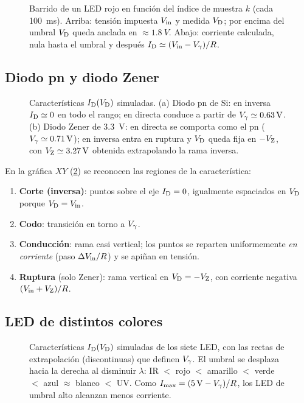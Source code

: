 \documentclass[11pt,a4paper]{article}
\begin{document}
\begin{figure}[htbp]
  \centering
  
  \caption{Barrido de un LED rojo en función del índice de muestra $k$
  (cada \SI{100}{ms}). Arriba: tensión impuesta $V_{\mathrm{in}}$ y medida $V_{\mathrm D}$; por
  encima del umbral $V_{\mathrm D}$ queda anclada en $\approx\SI{1.8}{V}$. Abajo:
  corriente calculada, nula hasta el umbral y después
  $I_{\mathrm D}\simeq(V_{\mathrm{in}}-V_{\gamma})/R$.}
  \label{fig:temporal}
\end{figure}

\subsection{Diodo pn y diodo Zener}

\begin{figure}[htbp]
  \centering
  
  \caption{Características $I_{\mathrm D}(V_{\mathrm D})$ simuladas. (a) Diodo pn de Si: en
  inversa $I_{\mathrm D}\simeq0$ en todo el rango; en directa conduce a partir de
  $V_{\gamma}\simeq\SI{0.63}{V}$. (b) Diodo Zener de \SI{3.3}{V}: en directa se
  comporta como el pn ($V_{\gamma}\simeq\SI{0.71}{V}$); en inversa entra en
  ruptura y $V_{\mathrm D}$ queda fija en $-V_{\mathrm Z}$, con $V_{\mathrm Z}\simeq\SI{3.27}{V}$
  obtenida extrapolando la rama inversa.}
  \label{fig:pn-zener}
\end{figure}

En la gráfica $XY$ (\cref{fig:pn-zener}) se reconocen las regiones de la
característica:
\begin{enumerate}
  \item \textbf{Corte (inversa)}: puntos sobre el eje $I_{\mathrm D}=0$, igualmente
    espaciados en $V_{\mathrm D}$ porque $V_{\mathrm D}=V_{\mathrm{in}}$.
  \item \textbf{Codo}: transición en torno a $V_{\gamma}$.
  \item \textbf{Conducción}: rama casi vertical; los puntos se reparten
    uniformemente \emph{en corriente} (paso $\Delta V_{\mathrm{in}}/R$) y se apiñan en
    tensión.
  \item \textbf{Ruptura} (solo Zener): rama vertical en $V_{\mathrm D}=-V_{\mathrm Z}$, con
    corriente negativa $(V_{\mathrm{in}}+V_{\mathrm Z})/R$.
\end{enumerate}

\subsection{LED de distintos colores}

\begin{figure}[htbp]
  \centering
  
  \caption{Características $I_{\mathrm D}(V_{\mathrm D})$ simuladas de los siete LED, con las
  rectas de extrapolación (discontinuas) que definen $V_{\gamma}$. El umbral se
  desplaza hacia la derecha al disminuir $\lambda$: IR $<$ rojo $<$ amarillo
  $<$ verde $<$ azul $\approx$ blanco $<$ UV. Como $I_{\max}=(\SI{5}{V}-V_{\gamma})/R$,
  los LED de umbral alto alcanzan menos corriente.}
  \label{fig:leds}
\end{figure}
\end{document}
